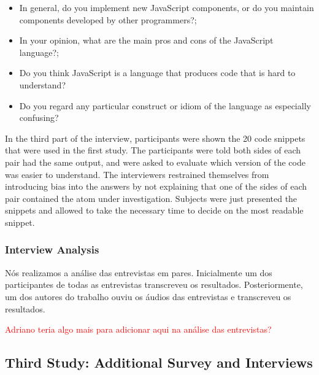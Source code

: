 \begin{itemize}
\item In general, do you implement new JavaScript components,
  or do you maintain components developed by other programmers?;

\item In your opinion, what are the main pros and cons of the JavaScript language?;

\item Do you think JavaScript is a language that produces code that is hard to understand?

\item Do you regard any particular construct or idiom of the language as
  especially confusing?
\end{itemize}


In the third part of the interview, participants were shown the 20 code snippets that were used in the first study. The participants were told both sides of each pair had the same output, and were asked to evaluate which version of the code was easier to understand. The interviewers restrained themselves from introducing bias into the answers by not explaining that one of the sides of each pair contained the atom under investigation. Subjects were just presented the snippets and allowed to take the necessary time to decide on the most readable snippet.

\subsubsection{Interview Analysis}

{\color{red}Nós realizamos a análise das entrevistas em pares. Inicialmente um dos participantes de todas as entrevistas transcreveu os resultados. Posteriormente, um dos autores do trabalho ouviu os áudios das entrevistas e transcreveu os resultados.} 

\textcolor{red}{Adriano teria algo mais para adicionar aqui na  análise das entrevistas?}


\subsection{Third Study: Additional Survey and Interviews}

